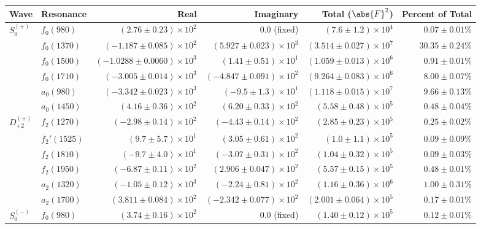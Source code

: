 \begin{table}[ht]
    \begin{center}
        \begin{tabular}{llrrrr}\toprule
        Wave & Resonance & Real & Imaginary & Total ($\abs{F}^2$) & Percent of Total \\\midrule
$S_{0}^{(+)}$ & $f_{0}(980)$ & $(2.76 \pm 0.23) \times 10^{2}$ & $0.0$ (fixed) & $(7.6 \pm 1.2) \times 10^{4}$ & $0.07 \pm 0.01 \%$ \\
 & $f_{0}(1370)$ & $(-1.187 \pm 0.085) \times 10^{2}$ & $(5.927 \pm 0.023) \times 10^{3}$ & $(3.514 \pm 0.027) \times 10^{7}$ & $30.35 \pm 0.24 \%$ \\
 & $f_{0}(1500)$ & $(-1.0288 \pm 0.0060) \times 10^{3}$ & $(1.41 \pm 0.51) \times 10^{1}$ & $(1.059 \pm 0.013) \times 10^{6}$ & $0.91 \pm 0.01 \%$ \\
 & $f_{0}(1710)$ & $(-3.005 \pm 0.014) \times 10^{3}$ & $(-4.847 \pm 0.091) \times 10^{2}$ & $(9.264 \pm 0.083) \times 10^{6}$ & $8.00 \pm 0.07 \%$ \\
 & $a_{0}(980)$ & $(-3.342 \pm 0.023) \times 10^{3}$ & $(-9.5 \pm 1.3) \times 10^{1}$ & $(1.118 \pm 0.015) \times 10^{7}$ & $9.66 \pm 0.13 \%$ \\
 & $a_{0}(1450)$ & $(4.16 \pm 0.36) \times 10^{2}$ & $(6.20 \pm 0.33) \times 10^{2}$ & $(5.58 \pm 0.48) \times 10^{5}$ & $0.48 \pm 0.04 \%$ \\
$D_{+2}^{(+)}$ & $f_{2}(1270)$ & $(-2.98 \pm 0.14) \times 10^{2}$ & $(-4.43 \pm 0.14) \times 10^{2}$ & $(2.85 \pm 0.23) \times 10^{5}$ & $0.25 \pm 0.02 \%$ \\
 & $f_{2}'(1525)$ & $(9.7 \pm 5.7) \times 10^{1}$ & $(3.05 \pm 0.61) \times 10^{2}$ & $(1.0 \pm 1.1) \times 10^{5}$ & $0.09 \pm 0.09 \%$ \\
 & $f_{2}(1810)$ & $(-9.7 \pm 4.0) \times 10^{1}$ & $(-3.07 \pm 0.31) \times 10^{2}$ & $(1.04 \pm 0.32) \times 10^{5}$ & $0.09 \pm 0.03 \%$ \\
 & $f_{2}(1950)$ & $(-6.87 \pm 0.11) \times 10^{2}$ & $(2.906 \pm 0.047) \times 10^{2}$ & $(5.57 \pm 0.15) \times 10^{5}$ & $0.48 \pm 0.01 \%$ \\
 & $a_{2}(1320)$ & $(-1.05 \pm 0.12) \times 10^{3}$ & $(-2.24 \pm 0.81) \times 10^{2}$ & $(1.16 \pm 0.36) \times 10^{6}$ & $1.00 \pm 0.31 \%$ \\
 & $a_{2}(1700)$ & $(3.811 \pm 0.084) \times 10^{2}$ & $(-2.342 \pm 0.077) \times 10^{2}$ & $(2.001 \pm 0.064) \times 10^{5}$ & $0.17 \pm 0.01 \%$ \\
$S_{0}^{(-)}$ & $f_{0}(980)$ & $(3.74 \pm 0.16) \times 10^{2}$ & $0.0$ (fixed) & $(1.40 \pm 0.12) \times 10^{5}$ & $0.12 \pm 0.01 \%$ \\

\end{tabular}
\end{center}
\end{table}
